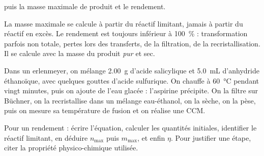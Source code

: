 puis la masse maximale de produit et le rendement.
\begin{attention}
La masse maximale se calcule à partir du réactif limitant, jamais à partir du réactif en excès. Le rendement est toujours
inférieur à \qty{100}{\percent} : transformation parfois non totale, pertes lors des transferts, de la filtration, de la
recristallisation. Il se calcule avec la masse du produit \emph{pur} et sec.
\end{attention}
\begin{experience}
Dans un erlenmeyer, on mélange \qty{2,00}{g} d'acide salicylique et \qty{5,0}{mL} d'anhydride éthanoïque, avec quelques gouttes d'acide
sulfurique. On chauffe à \qty{60}{\degreeCelsius} pendant vingt minutes, puis on ajoute de l'eau glacée : l'aspirine précipite. On la
filtre sur Büchner, on la recristallise dans un mélange eau-éthanol, on la sèche, on la pèse, puis on mesure sa
température de fusion et on réalise une CCM.
\end{experience}
\begin{rediger}
Pour un rendement : écrire l'équation, calculer les quantités initiales, identifier le réactif limitant, en déduire $n_\text{max}$
puis $m_\text{max}$, et enfin $\eta$. Pour justifier une étape, citer la propriété physico-chimique utilisée.
\end{rediger}
\exercices

